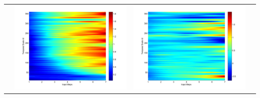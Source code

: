 \documentclass[11pt]{article}
\begin{document}
\begin{table}[H]
{\begin{tabular}{cccc}
&\begin{minipage}{.3\textwidth}\includegraphics[width=\linewidth]{resultgraph/06810000p.png}\end{minipage}
&\begin{minipage}{.3\textwidth}\includegraphics[width=\linewidth]{resultgraph/06810000diff_ep.png}\end{minipage}

\end{tabular}}
\end{table}
\end{document}
